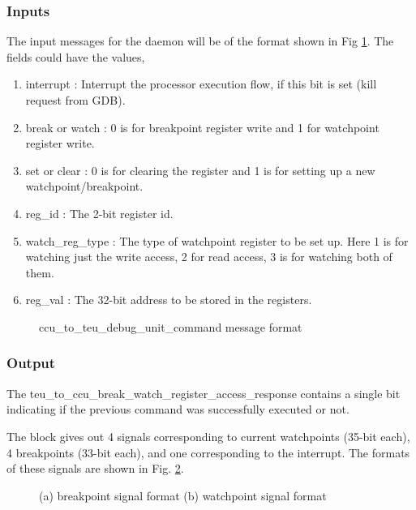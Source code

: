 \documentclass[a4paper, 11pt]{article}
\begin{document}
\subsubsection{Inputs}
The input messages for the daemon will be of the format shown in Fig \ref{write_packet}. The fields could have the values,

\begin{enumerate}
	
	\item interrupt : Interrupt the processor execution flow, if this bit is set (kill request from GDB).
	\item break or watch : 0 is for breakpoint register write and 1 for watchpoint register write.
	\item set or clear : 0 is for clearing the register and 1 is for setting up a new watchpoint/breakpoint.
	\item reg\_id : The 2-bit register id.
	\item watch\_reg\_type : The type of watchpoint register to be set up. Here 1 is for watching just the write access, 2 for read access, 3 is for watching both of them.
	\item reg\_val : The 32-bit address to be stored in the registers.
\end{enumerate}

\begin{figure}[h!]
	\centering
	\def\svgwidth{\textwidth}
	\caption{ccu\_to\_teu\_debug\_unit\_command message format}
	\label{write_packet}
\end{figure}

\subsubsection{Output}
The teu\_to\_ccu\_break\_watch\_register\_access\_response contains a single bit indicating if the previous command was successfully executed or not.

The block gives out 4 signals corresponding to current watchpoints (35-bit each), 4 breakpoints (33-bit each), and one corresponding to the interrupt. The formats of these signals are shown in Fig. \ref{active_signal_msg}.

\begin{figure}[h!]
	\centering
	\def\svgwidth{\textwidth}
	\caption{(a) breakpoint signal format (b) watchpoint signal format}
	\label{active_signal_msg}
\end{figure}
\end{document}
